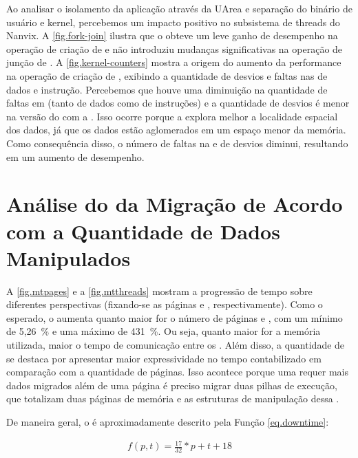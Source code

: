 Ao analisar o isolamento da aplicação através da UArea e separação do binário de usuário e kernel, percebemos um impacto positivo no subsistema de threads do Nanvix. A \autoref{fig.fork-join} ilustra que o \nanvix obteve um leve ganho de desempenho na operação de criação de \threads e não introduziu mudanças significativas na operação de junção de \threads. A \autoref{fig.kernel-counters} mostra a origem do aumento da performance na operação de criação de \threads, exibindo a quantidade de desvios e faltas nas \caches de dados e instrução. Percebemos que houve uma diminuição na quantidade de faltas em \cache (tanto de dados como de instruções) e a quantidade de desvios é menor na versão do \nanvix com a \uarea. Isso ocorre porque a \uarea explora melhor a localidade espacial dos dados, já que os dados estão aglomerados em um espaço menor da memória. Como consequência disso, o número de faltas na \cache e de desvios diminui, resultando em um aumento de desempenho.

\section{Análise do \downtime da Migração de Acordo com a Quantidade de Dados Manipulados}

A \autoref{fig.mtpages} e a \autoref{fig.mtthreads} mostram a progressão de tempo sobre diferentes perspectivas (fixando-se as páginas e \threads, respectivamente). Como o esperado, o \downtime aumenta quanto maior for o número de páginas e \threads, com um mínimo de 5,26~\% e uma máximo de 431~\%. Ou seja, quanto maior for a memória utilizada, maior o tempo de comunicação entre os \clusters. Além disso, a quantidade de \threads se destaca por apresentar maior expressividade no tempo contabilizado em comparação com a quantidade de páginas. Isso acontece porque uma \thread requer mais dados migrados além de uma página \eg é preciso migrar duas pilhas de execução, que totalizam duas páginas de memória e as estruturas de manipulação dessa \thread.

De maneira geral, o \downtime é aproximadamente descrito pela Função \ref{eq.downtime}:

\begin{equation}\label{eq.downtime}
    \begin{split}
        f(p, t) = \frac{17}{32}*p+t+18
    \end{split}
\end{equation}


